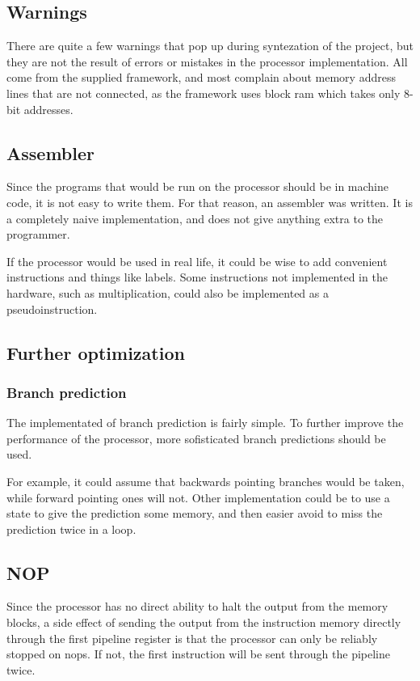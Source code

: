 \subsection{Warnings}

There are quite a few warnings that pop up during syntezation of the project, but they are not the result of errors or mistakes in the processor implementation.
All come from the supplied framework, and most complain about memory address lines that are not connected, as the framework uses block ram which takes only 8-bit addresses.

\subsection{Assembler}
Since the programs that would be run on the processor should be in machine code,
it is not easy to write them. For that reason, an assembler was written. It is a
completely naive implementation, and does not give anything extra to the
programmer. 

If the processor would be used in real life, it could be wise to add convenient
instructions and things like labels. Some instructions not implemented in the
hardware, such as multiplication, could also be implemented as a
pseudoinstruction.

\subsection{Further optimization}

\subsubsection*{Branch prediction}
The implementated of branch prediction is fairly simple. To further improve the
performance of the processor, more sofisticated branch predictions should be
used.

For example, it could assume that backwards pointing branches would be taken,
while forward pointing ones will not. Other implementation could be to use a
state to give the prediction some memory, and then easier avoid to miss the
prediction twice in a loop.\cite{wiki-branching}

\subsection{NOP}

Since the processor has no direct ability to halt the output from the memory blocks, a side effect of sending the output from the instruction memory directly through the first pipeline register is that the processor can only be reliably stopped on nops.
If not, the first instruction will be sent through the pipeline twice.


